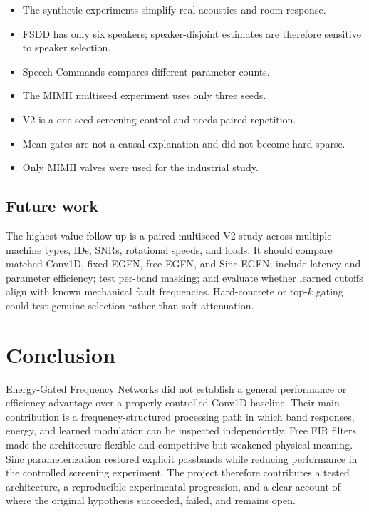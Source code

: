 \documentclass[10pt,twocolumn]{article}
\newcommand{\egfn}{EGFN}
\begin{document}
\begin{itemize}
  \item The synthetic experiments simplify real acoustics and room response.
  \item FSDD has only six speakers; speaker-disjoint estimates are therefore
        sensitive to speaker selection.
  \item Speech Commands compares different parameter counts.
  \item The MIMII multiseed experiment uses only three seeds.
  \item V2 is a one-seed screening control and needs paired repetition.
  \item Mean gates are not a causal explanation and did not become hard sparse.
  \item Only MIMII valves were used for the industrial study.
\end{itemize}

\subsection{Future work}

The highest-value follow-up is a paired multiseed V2 study across multiple
machine types, IDs, SNRs, rotational speeds, and loads. It should compare
matched Conv1D, fixed \egfn{}, free \egfn{}, and Sinc \egfn{}; include latency
and parameter efficiency; test per-band masking; and evaluate whether learned
cutoffs align with known mechanical fault frequencies. Hard-concrete or top-$k$
gating could test genuine selection rather than soft attenuation.

\section{Conclusion}

Energy-Gated Frequency Networks did not establish a general performance or
efficiency advantage over a properly controlled Conv1D baseline. Their main
contribution is a frequency-structured processing path in which band responses,
energy, and learned modulation can be inspected independently. Free FIR filters
made the architecture flexible and competitive but weakened physical meaning.
Sinc parameterization restored explicit passbands while reducing performance in
the controlled screening experiment. The project therefore contributes a
tested architecture, a reproducible experimental progression, and a clear
account of where the original hypothesis succeeded, failed, and remains open.
\end{document}
